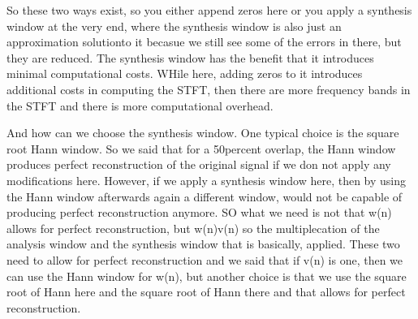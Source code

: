 So these two ways exist, so you either append zeros here or you apply a synthesis window at the very end, where the synthesis window is also just an approximation solutionto it becasue we still see some of the errors in there, but they are reduced.  The synthesis window has the benefit that it introduces minimal computational costs. WHile here, adding zeros to it introduces additional costs in computing the STFT, then there are more frequency bands in the STFT and there is more computational overhead. 

And how can we choose the synthesis window. One typical choice is the square root Hann window. So we said that for a 50percent overlap, the Hann window produces perfect reconstruction of the original signal if we don not apply any modifications here. However, if we apply a synthesis window here, then by using the Hann window afterwards again a different window, would not be capable of producing perfect reconstruction anymore.  SO what we need is not that w(n) allows for perfect reconstruction, but w(n)v(n) so the multiplecation of the analysis window and the synthesis window that is basically, applied.  These two need to allow for perfect reconstruction and we said that if v(n) is one, then we can use the Hann window for w(n), but another choice is that we use the square root of Hann here and the square root of Hann there and  that allows for perfect reconstruction.

